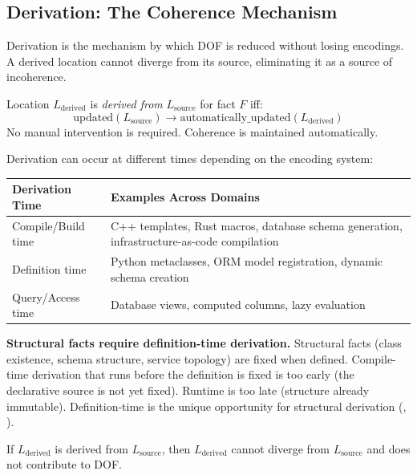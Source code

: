 \subsection{Derivation: The Coherence Mechanism}\label{sec:derivation}

Derivation is the mechanism by which DOF is reduced without losing encodings. A derived location cannot diverge from its source, eliminating it as a source of incoherence.

\begin{definition}[Derivation]\label{def:derivation}
Location $L_{\text{derived}}$ is \emph{derived from} $L_{\text{source}}$ for fact $F$ iff:
\[
\text{updated}(L_{\text{source}}) \rightarrow \text{automatically\_updated}(L_{\text{derived}})
\]
No manual intervention is required. Coherence is maintained automatically.
\end{definition}

Derivation can occur at different times depending on the encoding system:

\begin{center}
\begin{tabularx}{\linewidth}{lY}
\toprule
\textbf{Derivation Time} & \textbf{Examples Across Domains} \\
\midrule
Compile/Build time & C++ templates, Rust macros, database schema generation, infrastructure-as-code compilation \\
Definition time & Python metaclasses, ORM model registration, dynamic schema creation \\
Query/Access time & Database views, computed columns, lazy evaluation \\
\bottomrule
\end{tabularx}
\end{center}

\textbf{Structural facts require definition-time derivation.} Structural facts (class existence, schema structure, service topology) are fixed when defined. Compile-time derivation that runs before the definition is fixed is too early (the declarative source is not yet fixed). Runtime is too late (structure already immutable). Definition-time is the unique opportunity for structural derivation (, ).

\begin{theorem}\label{thm:derivation-excludes}
If $L_{\text{derived}}$ is derived from $L_{\text{source}}$, then $L_{\text{derived}}$ cannot diverge from $L_{\text{source}}$ and does not contribute to DOF.
\end{theorem}

